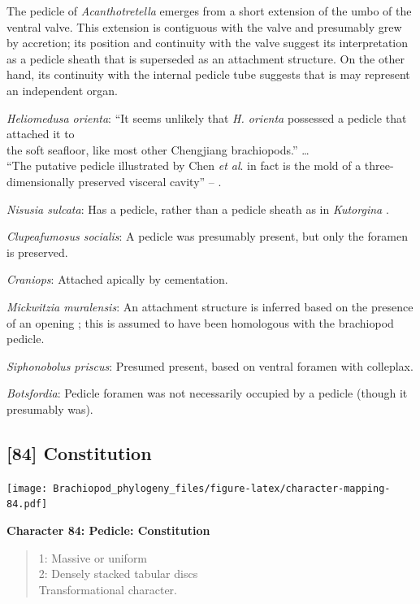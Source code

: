 \documentclass[]{book}
\theoremstyle{definition}
\theoremstyle{definition}
\theoremstyle{definition}
\theoremstyle{remark}
\begin{document}
The pedicle of \emph{Acanthotretella} emerges from a short extension of
the umbo of the ventral valve. This extension is contiguous with the
valve and presumably grew by accretion; its position and continuity with
the valve suggest its interpretation as a pedicle sheath that is
superseded as an attachment structure. On the other hand, its continuity
with the internal pedicle tube suggests that is may represent an
independent organ.

\emph{Heliomedusa orienta}: ``It seems unlikely that \emph{H. orienta}
possessed a pedicle that attached it to\\
the soft seafloor, like most other Chengjiang brachiopods.'' \ldots{}\\
``The putative pedicle illustrated by Chen \emph{et al}.
\citeyearpar[Figs 4, 6, 7]{Chen2007Reinterpretationof} in fact is the
mold of a three-dimensionally preserved visceral cavity'' --
\citet{Zhang2009Architectureand}.

\emph{Nisusia sulcata}: Has a pedicle, rather than a pedicle sheath as
in \emph{Kutorgina}
\citep{Holmer2018Evolutionarysignificance, Holmer2018Theattachment}.

\emph{Clupeafumosus socialis}: A pedicle was presumably present, but
only the foramen is preserved.

\emph{Craniops}: Attached apically by cementation.

\emph{Mickwitzia muralensis}: An attachment structure is inferred based
on the presence of an opening \citep{Balthasar2004Shellstructure}; this
is assumed to have been homologous with the brachiopod pedicle.

\emph{Siphonobolus priscus}: Presumed present, based on ventral foramen
with colleplax.

\emph{Botsfordia}: Pedicle foramen was not necessarily occupied by a
pedicle (though it presumably was).

\hypertarget{constitution}{%
\subsection*{{[}84{]} Constitution}\label{constitution}}

\texttt{[image: Brachiopod\_phylogeny\_files/figure-latex/character-mapping-84.pdf]}

\textbf{Character 84: Pedicle: Constitution}

\begin{quote}
1: Massive or uniform\\
2: Densely stacked tabular discs\\
Transformational character.
\end{quote}
\end{document}
